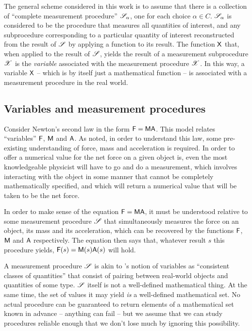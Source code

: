 The general scheme considered in this work is to assume that there is a collection of  ``complete measurement procedure'' $\mathscr{S}_\alpha$, one for each choice $\alpha\in C$. $\mathscr{S}_\alpha$ is considered to be the procedure that measures all quantities of interest, and any subprocedure corresponding to a particular quantity of interest reconstructed from the result of $\mathscr{S}$ by applying a function to its result. The function $\mathsf{X}$ that, when applied to the result of $\mathscr{S}$, yields the result of a measurement subprocedure $\mathscr{X}$ is the \emph{variable} associated with the measurement procedure $\mathscr{X}$. In this way, a variable $\mathsf{X}$ -- which is by itself just a mathematical function -- is associated with a measurement procedure in the real world.

\subsection{Variables and measurement procedures}

Consider Newton's second law in the form $\mathsf{F}=\mathsf{MA}$. This model relates ``variables'' $\mathsf{F}$, $\mathsf{M}$ and $\mathsf{A}$. As \citet{feynman_feynman_1979} noted, in order to understand this law, some pre-existing understanding of force, mass and acceleration is required. In order to offer a numerical value for the net force on a given object is, even the most knowledgeable physicist will have to go and do a measurement, which involves interacting with the object in some manner that cannot be completely mathematically specified, and which will return a numerical value that will be taken to be the net force.

In order to make sense of the equation $\mathsf{F}=\mathsf{MA}$, it must be understood relative to some measurement procedure $\mathscr{S}$ that simultaneously measures the force on an object, its mass and its acceleration, which can be recovered by the functions $\mathsf{F}$, $\mathsf{M}$ and $\mathsf{A}$ respectively. The equation then says that, whatever result $s$ this procedure yields, $\mathsf{F}(s)=\mathsf{M}(s)\mathsf{A}(s)$ will hold.

A measurement procedure $\mathscr{S}$ is akin to \citet{menger_random_2003}'s notion of variables as ``consistent classes of quantities'' that consist of pairing between real-world objects and quantities of some type. $\mathscr{S}$ itself is not a well-defined mathematical thing. At the same time, the set of values it may yield \emph{is} a well-defined mathematical set. No actual procedure can be guaranteed to return elements of a mathematical set known in advance -- anything can fail -- but we assume that we can study procedures reliable enough that we don't lose much by ignoring this possibility.

